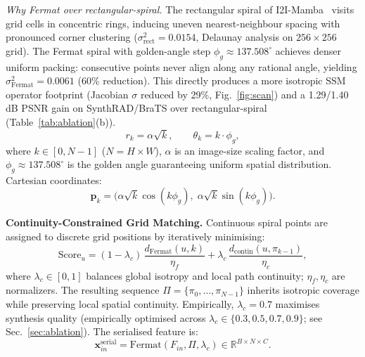 \documentclass[runningheads]{llncs}
\begin{document}
\noindent\textit{Why Fermat over rectangular-spiral.}
The rectangular spiral of I2I-Mamba~\cite{xing2024i2imamba} visits
grid cells in concentric rings, inducing uneven nearest-neighbour
spacing with pronounced corner clustering
($\sigma^2_{\text{rect}}{=}0.0154$, Delaunay analysis on
$256{\times}256$ grid).
The Fermat spiral with golden-angle step
$\phi_g{\approx}137.508^\circ$ achieves denser uniform packing:
consecutive points never align along any rational angle, yielding
$\sigma^2_{\text{Fermat}}{=}0.0061$ (60\% reduction).
This directly produces a more isotropic SSM operator footprint
(Jacobian $\sigma$ reduced by 29\%, Fig.~\ref{fig:scan}) and
a 1.29/1.40\,dB PSNR gain on SynthRAD/BraTS over rectangular-spiral
(Table~\ref{tab:ablation}(b)).
\begin{equation}
  r_k = \alpha\sqrt{k},\qquad \theta_k = k\cdot\phi_g,
  \label{eq:fermat}
\end{equation}
where $k\!\in\![0,N{-}1]$ ($N{=}H{\times}W$), $\alpha$ is an
image-size scaling factor, and $\phi_g\!\approx\!137.508^\circ$ is
the golden angle guaranteeing uniform spatial distribution.
Cartesian coordinates:
\begin{equation}
  \mathbf{p}_k =
    \bigl(\alpha\sqrt{k}\cos(k\phi_g),\;
          \alpha\sqrt{k}\sin(k\phi_g)\bigr).
  \label{eq:fermat_xy}
\end{equation}

\noindent\textbf{Continuity-Constrained Grid Matching.}
Continuous spiral points are assigned to discrete grid positions
by iteratively minimising:
\begin{equation}
  \mathrm{Score}_u =
    (1{-}\lambda_c)\,\frac{d_{\mathrm{Fermat}}(u,k)}{\eta_f}
    +\lambda_c\,\frac{d_{\mathrm{contin}}(u,\pi_{k-1})}{\eta_c},
  \label{eq:score}
\end{equation}
where $\lambda_c\!\in\![0,1]$ balances global isotropy and local
path continuity; $\eta_f,\eta_c$ are normalizers. The resulting
sequence $\Pi{=}\{\pi_0,\dots,\pi_{N-1}\}$ inherits isotropic
coverage while preserving local spatial continuity. Empirically,
$\lambda_c{=}0.7$ maximises synthesis quality (empirically optimised
across $\lambda_c\in\{0.3,0.5,0.7,0.9\}$; see Sec.~\ref{sec:ablation}). The serialised feature is:
\begin{equation}
  \mathbf{x}^{\mathrm{serial}}_{in}
    = \mathrm{Fermat}(F_{in},\Pi,\lambda_c)
    \in\mathbb{R}^{B\times N\times C}.
  \label{eq:serial}
\end{equation}
\end{document}
